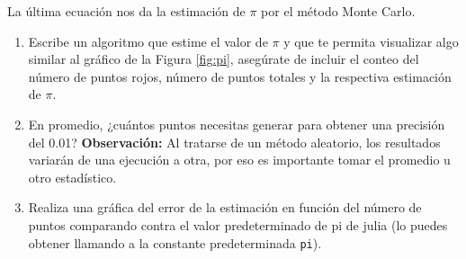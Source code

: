 \documentclass[a4paper]{article}
\begin{document}
La última ecuación nos da la estimación de $\pi$ por el método Monte Carlo.

\begin{enumerate}
    \item Escribe un algoritmo que estime el valor de $\pi$ y que te permita visualizar algo similar al gráfico de la Figura \ref{fig:pi}, asegúrate de incluir el conteo del número de puntos rojos, número de puntos totales y la respectiva estimación de $\pi$.
    \item En promedio, ¿cuántos puntos necesitas generar para obtener una precisión del 0.01? \textbf{Observación:} Al tratarse de un método aleatorio, los resultados variarán de una ejecución a otra, por eso es importante tomar el promedio u otro estadístico.
    \item Realiza una gráfica del error de la estimación en función del número de puntos comparando contra el valor predeterminado de pi de julia (lo puedes obtener llamando a la constante predeterminada \texttt{pi}).
\end{enumerate}
\end{document}
